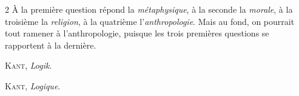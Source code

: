 \documentclass[a5paper,12pt,landscape]{article}
\newcommand\chunks[2]{%
\begin{leftcolumn*}\begin{otherlanguage}{german}%
{#1}%
\end{otherlanguage}\end{leftcolumn*}%
\begin{rightcolumn}\begin{otherlanguage}{french}%
{#2}%
\end{otherlanguage}\end{rightcolumn}%
}
\begin{document}
\begin{paracol}{2}
{À la première question répond la \emph{métaphysique}, à la seconde la \emph{morale}, à la troisième la \emph{religion}, à la quatrième l'\emph{anthropologie}. Mais au fond, on pourrait tout ramener à l'anthropologie, puisque les trois premières questions se rapportent à la dernière.}

  \chunks{\begin{flushright}
          \large\textsc{Kant}, \textit{Logik}.
          \end{flushright}}
         {\begin{flushright}
          \large\textsc{Kant}, \textit{Logique}.
          \end{flushright}}

\end{paracol}
\end{document}
